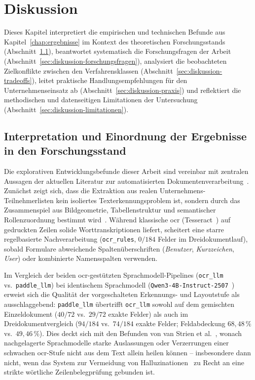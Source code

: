 \chapter{Diskussion}
\label{chap:diskussion}

Dieses Kapitel interpretiert die empirischen und technischen Befunde aus Kapitel~\ref{chap:ergebnisse} im Kontext des theoretischen Forschungsstands (Abschnitt~\ref{sec:diskussion-interpretation}), beantwortet systematisch die Forschungsfragen der Arbeit (Abschnitt~\ref{sec:diskussion-forschungsfragen}), analysiert die beobachteten Zielkonflikte zwischen den Verfahrensklassen (Abschnitt~\ref{sec:diskussion-tradeoffs}), leitet praktische Handlungsempfehlungen für den Unternehmenseinsatz ab (Abschnitt~\ref{sec:diskussion-praxis}) und reflektiert die methodischen und datenseitigen Limitationen der Untersuchung (Abschnitt~\ref{sec:diskussion-limitationen}).

\section{Interpretation und Einordnung der Ergebnisse in den Forschungsstand}
\label{sec:diskussion-interpretation}

Die explorativen Entwicklungsbefunde dieser Arbeit sind vereinbar mit zentralen Aussagen der aktuellen Literatur zur automatisierten Dokumentenverarbeitung~\cite{Skalicky2022Benchmarks,Fu2025OCRBenchV2,Kim2022Donut}. Zunächst zeigt sich, dass die Extraktion aus realen Unternehmens-Teilnehmerlisten kein isoliertes Texterkennungsproblem ist, sondern durch das Zusammenspiel aus Bildgeometrie, Tabellenstruktur und semantischer Rollenzuordnung bestimmt wird~\cite{OGorman1997DIA,Jaume2019FUNSD}. Während klassische \ac{ocr} (Tesseract~\cite{Smith2007Tesseract}) auf gedruckten Zeilen solide Worttranskriptionen liefert, scheitert eine starre regelbasierte Nachverarbeitung (\texttt{ocr\_rules}, $0/184$ Felder im Dreidokumentlauf), sobald Formulare abweichende Spaltenüberschriften (\emph{Benutzer}, \emph{Kurzzeichen}, \emph{User}) oder kombinierte Namensspalten verwenden.

Im Vergleich der beiden \ac{ocr}-gestützten Sprachmodell-Pipelines (\texttt{ocr\_llm} vs.\ \texttt{paddle\_llm}) bei identischem Sprachmodell (\texttt{Qwen3-4B-Instruct-2507}~\cite{Yang2025Qwen3}) erweist sich die Qualität der vorgeschalteten Erkennungs- und Layoutstufe als ausschlaggebend: \texttt{paddle\_llm} übertrifft \texttt{ocr\_llm} sowohl auf dem gemischten Einzeldokument ($40/72$ vs.\ $29/72$ exakte Felder) als auch im Dreidokumentvergleich ($94/184$ vs.\ $74/184$ exakte Felder; Feldabdeckung $68{,}48\,\%$ vs.\ $49{,}46\,\%$). Dies deckt sich mit den Befunden von van Strien et al.~\cite{vanStrien2020OCRQuality}, wonach nachgelagerte Sprachmodelle starke Auslassungen oder Verzerrungen einer schwachen \ac{ocr}-Stufe nicht aus dem Text allein heilen können -- insbesondere dann nicht, wenn das System zur Vermeidung von Halluzinationen~\cite{Huang2024Hallucination} zu Recht an eine strikte wörtliche Zeilenbelegprüfung gebunden ist.

